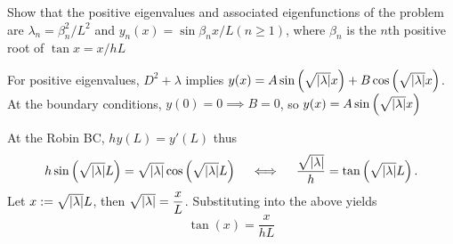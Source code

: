 
Show that the positive eigenvalues and associated eigenfunctions of the problem are
$\lambda_n = \beta_n^2/L^2$ and $y_n(x) = \sin \beta_n x/L (n \geq 1)$, where $\beta_n$ is the $n$th positive root of
$\tan x = x/hL$

\soln* 
For positive eigenvalues, $D^2 + \lambda$ implies $y(x) = A \sinp{\rabsl x} + B \cosp{\rabsl x}$.
At the boundary conditions, $y(0) = 0 \implies B = 0$, so $y(x) = A \sinp{\rabsl x}$

\nl At the Robin BC, $hy(L) = y'(L)$ thus
$$h \sinp{\rabsl L} = \rabsl \cosp{\rabsl L} \qiffq \frac{\rabsl}{h} = \tan \pars{\rabsl L}.$$
Let $x := \sqrt{\abs{\lambda}} L$, then $\sqrt{\abs{\lambda}} = \dfrac{x}{L}$. Substituting into the above yields
$$\tan(x) = \frac{x}{hL}$$